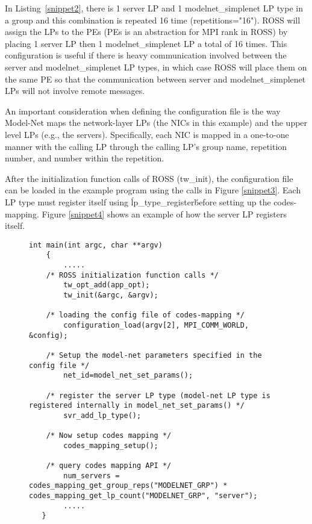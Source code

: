 \documentclass[conference,10pt,compsocconf,onecolumn]{IEEEtran}
\begin{document}
In Listing~\ref{snippet2}, there is 1 server LP and 1 modelnet\_simplenet LP
type in a group and this combination is repeated 16 time (repetitions="16").
ROSS will assign the LPs to the PEs (PEs is an abstraction for MPI rank in ROSS)
by placing 1 server LP then 1 modelnet\_simplenet LP a total of 16 times. This
configuration is useful if there is heavy communication involved between the
server and modelnet\_simplenet LP types, in which case ROSS will place them on
the same PE so that the communication between server and modelnet\_simplenet LPs
will not involve remote messages. 

An important consideration when defining the configuration file is the way
Model-Net maps the network-layer LPs (the NICs in this example) and the upper
level LPs (e.g., the servers). Specifically, each NIC is mapped in a one-to-one
manner with the calling LP through the calling LP's group name, repetition
number, and number within the repetition.

After the initialization function calls of ROSS (tw\_init), the configuration
file can be loaded in the example program using the calls in Figure
\ref{snippet3}. Each LP type must register itself using \'lp\_type\_register\'
before setting up the codes-mapping. Figure \ref{snippet4} shows an example of how
the server LP registers itself. 

\begin{figure}
\begin{lstlisting}[caption=CODES mapping function calls in example program, label=snippet3]
    int main(int argc, char **argv)
    {
    	.....
	/* ROSS initialization function calls */
    	tw_opt_add(app_opt);
    	tw_init(&argc, &argv);

	/* loading the config file of codes-mapping */
    	configuration_load(argv[2], MPI_COMM_WORLD, &config);

	/* Setup the model-net parameters specified in the config file */
    	net_id=model_net_set_params();
	
	/* register the server LP type (model-net LP type is registered internally in model_net_set_params() */
    	svr_add_lp_type();

	/* Now setup codes mapping */
    	codes_mapping_setup();

	/* query codes mapping API */
    	num_servers = codes_mapping_get_group_reps("MODELNET_GRP") * codes_mapping_get_lp_count("MODELNET_GRP", "server");
    	..... 
   }
\end{lstlisting}
\end{figure}
\end{document}
